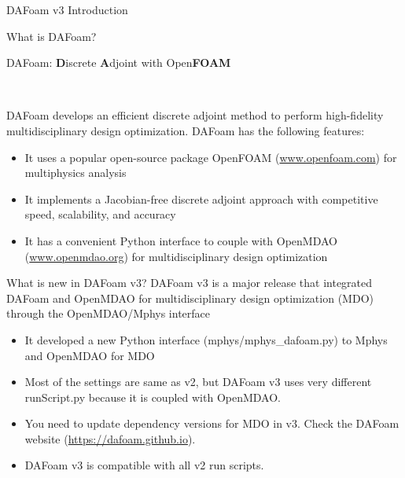 \documentclass{bredelebeamer}
\begin{document}
\begin{frame}{}
  \center \Large DAFoam v3 Introduction
\end{frame}

\begin{frame}{What is DAFoam?}

  {\large DAFoam: \textbf{D}iscrete \textbf{A}djoint with Open\textbf{FOAM}}

  ~

  DAFoam develops an efficient discrete adjoint method to perform high-fidelity multidisciplinary design optimization. DAFoam has the following features:
  \center \normalsize
  \begin{itemize}
    \setlength\itemsep{1em}
    \item It uses a popular open-source package OpenFOAM (\url{www.openfoam.com}) for multiphysics analysis
    \item It implements a Jacobian-free discrete adjoint approach with competitive speed, scalability, and accuracy
    \item It has a convenient Python interface to couple with OpenMDAO (\url{www.openmdao.org}) for multidisciplinary design optimization
  \end{itemize}

\end{frame}

\begin{frame}{What is new in DAFoam v3?}
  DAFoam v3 is a major release that integrated DAFoam and OpenMDAO for multidisciplinary design optimization (MDO) through the OpenMDAO/Mphys interface

  \begin{itemize}
    \setlength\itemsep{1em}
    \item It developed a new Python interface (mphys/mphys\_dafoam.py) to Mphys and OpenMDAO for MDO
    \item Most of the settings are same as v2, but DAFoam v3 uses very different runScript.py because it is coupled with OpenMDAO.
    \item You need to update dependency versions for MDO in v3. Check the DAFoam website (\url{https://dafoam.github.io}).
    \item DAFoam v3 is compatible with all v2 run scripts.
  \end{itemize}
  
\end{frame}
\end{document}
